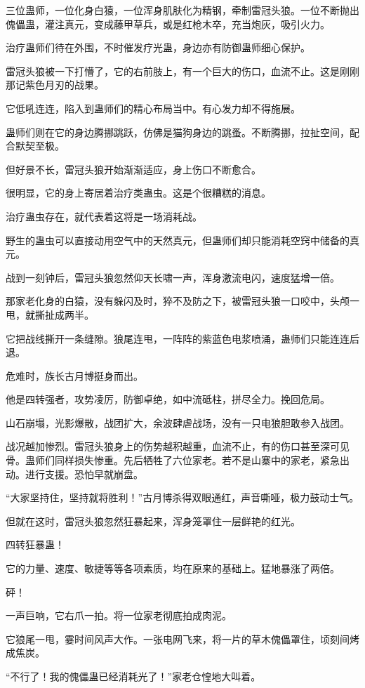\begin{this_body}
三位蛊师，一位化身白猿，一位浑身肌肤化为精钢，牵制雷冠头狼。一位不断抛出傀儡蛊，灌注真元，变成藤甲草兵，或是红枪木卒，充当炮灰，吸引火力。

治疗蛊师们待在外围，不时催发疗光蛊，身边亦有防御蛊师细心保护。

雷冠头狼被一下打懵了，它的右前肢上，有一个巨大的伤口，血流不止。这是刚刚那记紫色月刃的战果。

它低吼连连，陷入到蛊师们的精心布局当中。有心发力却不得施展。

蛊师们则在它的身边腾挪跳跃，仿佛是猫狗身边的跳蚤。不断腾挪，拉扯空间，配合默契至极。

但好景不长，雷冠头狼开始渐渐适应，身上伤口不断愈合。

很明显，它的身上寄居着治疗类蛊虫。这是个很糟糕的消息。

治疗蛊虫存在，就代表着这将是一场消耗战。

野生的蛊虫可以直接动用空气中的天然真元，但蛊师们却只能消耗空窍中储备的真元。

战到一刻钟后，雷冠头狼忽然仰天长啸一声，浑身激流电闪，速度猛增一倍。

那家老化身的白猿，没有躲闪及时，猝不及防之下，被雷冠头狼一口咬中，头颅一甩，就撕扯成两半。

它把战线撕开一条缝隙。狼尾连甩，一阵阵的紫蓝色电浆喷涌，蛊师们只能连连后退。

危难时，族长古月博挺身而出。

他是四转强者，攻势凌厉，防御卓绝，如中流砥柱，拼尽全力。挽回危局。

山石崩塌，光影爆散，战团扩大，余波肆虐战场，没有一只电狼胆敢参入战团。

战况越加惨烈。雷冠头狼身上的伤势越积越重，血流不止，有的伤口甚至深可见骨。蛊师们同样损失惨重。先后牺牲了六位家老。若不是山寨中的家老，紧急出动。进行支援。恐怕早就崩盘。

“大家坚持住，坚持就将胜利！”古月博杀得双眼通红，声音嘶哑，极力鼓动士气。

但就在这时，雷冠头狼忽然狂暴起来，浑身笼罩住一层鲜艳的红光。

四转狂暴蛊！

它的力量、速度、敏捷等等各项素质，均在原来的基础上。猛地暴涨了两倍。

砰！

一声巨响，它右爪一拍。将一位家老彻底拍成肉泥。

它狼尾一甩，霎时间风声大作。一张电网飞来，将一片的草木傀儡罩住，顷刻间烤成焦炭。

“不行了！我的傀儡蛊已经消耗光了！”家老仓惶地大叫着。


\end{this_body}
